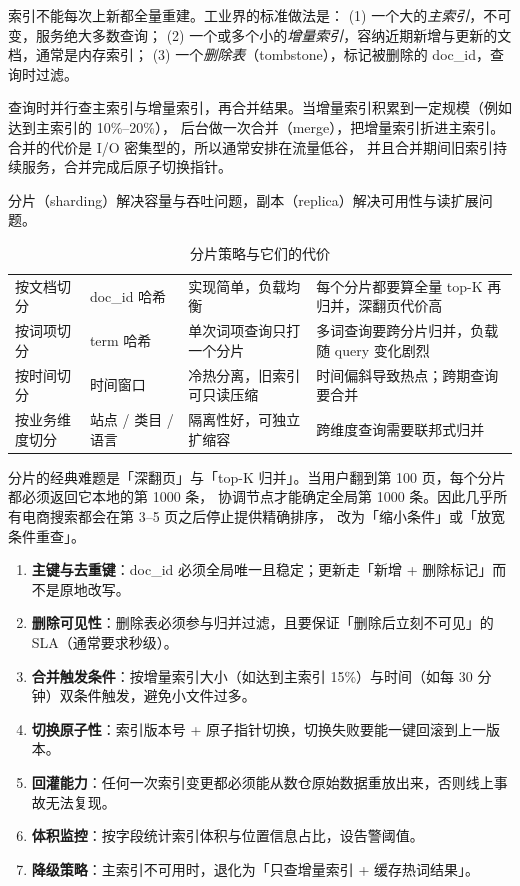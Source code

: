 索引不能每次上新都全量重建。工业界的标准做法是：
(1) 一个大的\emph{主索引}，不可变，服务绝大多数查询；
(2) 一个或多个小的\emph{增量索引}，容纳近期新增与更新的文档，通常是内存索引；
(3) 一个\emph{删除表}（tombstone），标记被删除的 doc\_id，查询时过滤。

查询时并行查主索引与增量索引，再合并结果。当增量索引积累到一定规模（例如达到主索引的 10\%--20\%），
后台做一次合并（merge），把增量索引折进主索引。合并的代价是 I/O 密集型的，所以通常安排在流量低谷，
并且合并期间旧索引持续服务，合并完成后原子切换指针。

分片（sharding）解决容量与吞吐问题，副本（replica）解决可用性与读扩展问题。

\begin{table}[htbp]
\centering
\caption{分片策略与它们的代价}
\label{tab:sharding}
\small
\begin{tabularx}{\textwidth}{L{2.3cm} L{2.6cm} L{3.0cm} Y}
\toprule
{} &  &  &  \\
\midrule
按文档切分 & doc\_id 哈希 & 实现简单，负载均衡 & 每个分片都要算全量 top-K 再归并，深翻页代价高 \\
按词项切分 & term 哈希 & 单次词项查询只打一个分片 & 多词查询要跨分片归并，负载随 query 变化剧烈 \\
按时间切分 & 时间窗口 & 冷热分离，旧索引可只读压缩 & 时间偏斜导致热点；跨期查询要合并 \\
按业务维度切分 & 站点 / 类目 / 语言 & 隔离性好，可独立扩缩容 & 跨维度查询需要联邦式归并 \\
\bottomrule
\end{tabularx}
\end{table}

分片的经典难题是「深翻页」与「top-K 归并」。当用户翻到第 100 页，每个分片都必须返回它本地的第 1000 条，
协调节点才能确定全局第 1000 条。因此几乎所有电商搜索都会在第 3--5 页之后停止提供精确排序，
改为「缩小条件」或「放宽条件重查」。

\begin{toolbox}[搭建增量索引的检查清单]
\begin{enumerate}
  \item \textbf{主键与去重键}：doc\_id 必须全局唯一且稳定；更新走「新增 + 删除标记」而不是原地改写。
  \item \textbf{删除可见性}：删除表必须参与归并过滤，且要保证「删除后立刻不可见」的 SLA（通常要求秒级）。
  \item \textbf{合并触发条件}：按增量索引大小（如达到主索引 15\%）与时间（如每 30 分钟）双条件触发，避免小文件过多。
  \item \textbf{切换原子性}：索引版本号 + 原子指针切换，切换失败要能一键回滚到上一版本。
  \item \textbf{回灌能力}：任何一次索引变更都必须能从数仓原始数据重放出来，否则线上事故无法复现。
  \item \textbf{体积监控}：按字段统计索引体积与位置信息占比，设告警阈值。
  \item \textbf{降级策略}：主索引不可用时，退化为「只查增量索引 + 缓存热词结果」。
\end{enumerate}
\end{toolbox}

